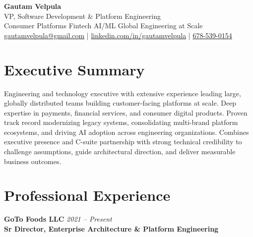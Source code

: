 \documentclass[11pt]{article}
\begin{document}
\begin{center}
    {\LARGE \textbf{Gautam Velpula}} \\[4pt]
    VP, Software Development \& Platform Engineering \\[6pt]
    Consumer Platforms \textbullet{} Fintech \textbullet{} AI/ML \textbullet{} Global Engineering at Scale \\[6pt]
    \href{mailto:gautamvelpula@gmail.com}{gautamvelpula@gmail.com} \;|\;
    \href{https://www.linkedin.com/in/gautamvelpula}{linkedin.com/in/gautamvelpula} \;|\;
    \href{tel:6785390154}{678-539-0154}
  \end{center}

\vspace{8pt}

\section*{Executive Summary}
Engineering and technology executive with extensive experience leading large, globally distributed teams building customer-facing platforms at scale. Deep expertise in payments, financial services, and consumer digital products. Proven track record modernizing legacy systems, consolidating multi-brand platform ecosystems, and driving AI adoption across engineering organizations. Combines executive presence and C-suite partnership with strong technical credibility to challenge assumptions, guide architectural direction, and deliver measurable business outcomes.

\section*{Professional Experience}

\textbf{GoTo Foods LLC} \hfill \textit{2021 -- Present} \\
\textbf{Sr Director, Enterprise Architecture \& Platform Engineering}
\end{document}
